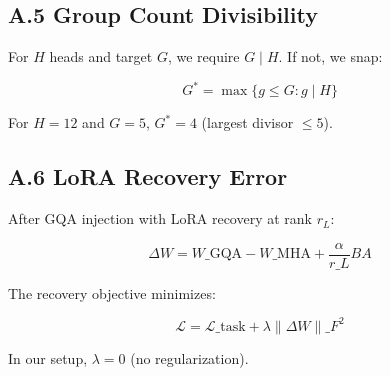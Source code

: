\subsection{A.5 Group Count Divisibility}

For $H$ heads and target $G$, we require $G \mid H$. If not, we snap:

\[
G^* = \max\{g \le G : g \mid H\}
\tag{A.13}
\]

For $H = 12$ and $G = 5$, $G^* = 4$ (largest divisor $\le 5$).

\subsection{A.6 LoRA Recovery Error}

After GQA injection with LoRA recovery at rank $r_L$:

\[
\Delta W = W\_\text{GQA} - W\_\text{MHA} + \frac{\alpha}{r\_L} B A
\tag{A.14}
\]

The recovery objective minimizes:

\[
\mathcal{L} = \mathcal{L}\_\text{task} + \lambda \|\Delta W\|\_F^2
\tag{A.15}
\]

In our setup, $\lambda = 0$ (no regularization).